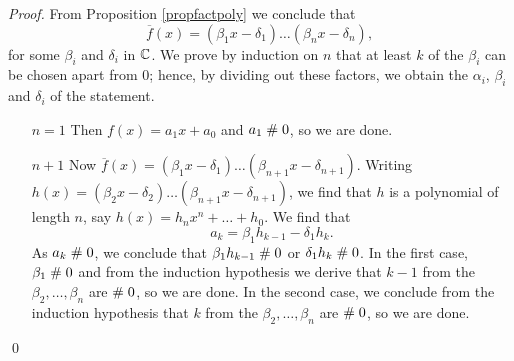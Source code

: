 \begin{proof}
From Proposition \ref{propfactpoly} we conclude that
$$\overline{f}(x)=(\beta_1 x-\delta_1)\ldots(\beta_n x-\delta_n),$$
for some $\beta_i$ and $\delta_i$ in $\mathbb{C}$. We prove by induction on
$n$ that at least $k$ of the $\beta_i$ can be chosen apart from $0$;
hence, by dividing out these factors, we obtain the $\alpha_i$, $\beta_i$
and $\delta_i$ of the statement.
\begin{itemize}
\item[$n=1$] Then $f(x) = a_1 x + a_0$ and $a_1\mathrel{\#} 0$, so we are
	done.
\item[$n+1$] Now $\overline{f}(x)=(\beta_1 x-\delta_1)
	\ldots(\beta_{n+1} x-\delta_{n+1})$. Writing $h(x) =(\beta_2
	x-\delta_2) \ldots(\beta_{n+1} x-\delta_{n+1})$, we find that
	$h$ is a polynomial of length $n$, say $h(x) = h_n x^n +\ldots
	+ h_0$. We find that 
$$a_k = \beta_1 h_{k-1} - \delta_1 h_k.$$	
	As $a_k \mathrel{\#} 0$, we conclude that $\beta_1 h_{k-1}\mathrel{\#} 0$
	or $\delta_1 h_k\mathrel{\#} 0$. In the first case, $\beta_1\mathrel{\#} 0$
	and from the induction hypothesis we derive that $k-1$ from
	the $\beta_2 ,\ldots, \beta_n$ are $\mathrel{\#} 0$, so we are
	done. In the second case, we conclude from the induction
	hypothesis that $k$ from 
	the $\beta_2 ,\ldots, \beta_n$ are $\mathrel{\#} 0$, so we are
	done. 
\end{itemize}
\qed
\end{proof}

